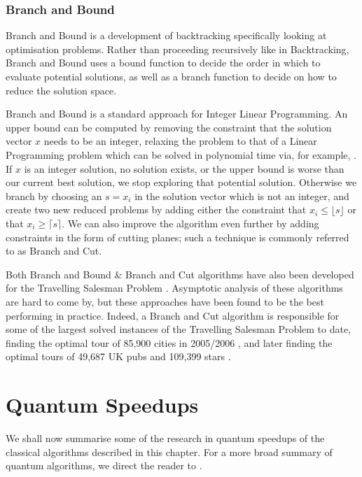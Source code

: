 \subsubsection{Branch and Bound}

Branch and Bound is a development of backtracking specifically looking at optimisation problems. Rather than proceeding recursively like in Backtracking, Branch and Bound uses a bound function to decide the order in which to evaluate potential solutions, as well as a branch function to decide on how to reduce the solution space.

Branch and Bound is a standard approach for Integer Linear Programming. An upper bound can be computed by removing the constraint that the solution vector $x$ needs to be an integer, relaxing the problem to that of a Linear Programming problem which can be solved in polynomial time via, for example, \cite{cohen2019}. If $x$ is an integer solution, no solution exists, or the upper bound is worse than our current best solution, we stop exploring that potential solution. Otherwise we branch by choosing an $s = x_i$ in the solution vector which is not an integer, and create two new reduced problems by adding either the constraint that $x_i \leq \lfloor s \rfloor$ or that $x_i \geq \lceil s \rceil$. We can also improve the algorithm even further by adding constraints in the form of cutting planes; such a technique is commonly referred to as Branch and Cut.

Both Branch and Bound \& Branch and Cut algorithms have also been developed for the Travelling Salesman Problem \cite{little1963, padberg1991}. Asymptotic analysis of these algorithms are hard to come by, but these approaches have been found to be the best performing in practice. Indeed, a Branch and Cut algorithm is responsible for some of the largest solved instances of the Travelling Salesman Problem to date, finding the optimal tour of 85,900 cities in 2005/2006 \cite{applegate2006}, and later finding the optimal tours of 49,687 UK pubs and 109,399 stars \cite{tspuk49687}.

\section{Quantum Speedups}
\label{sec:quantum-np}

We shall now summarise some of the research in quantum speedups of the classical algorithms described in this chapter. For a more broad summary of quantum algorithms, we direct the reader to \cite{montanaro2016}.

